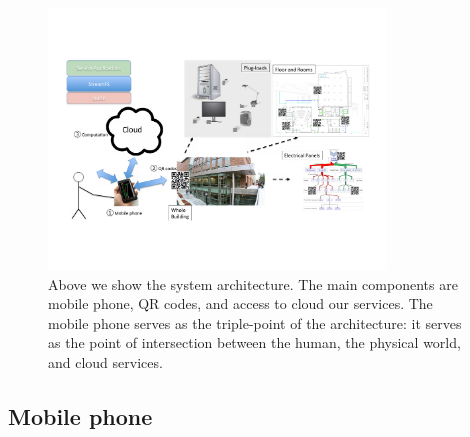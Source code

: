 \begin{figure}[htb!]
\begin{center}
\includegraphics[width=0.8\textwidth]{figs/sysarch}
\caption{Above we show the system architecture.  The main components are mobile phone, QR codes, and access to cloud
our services.  The mobile phone serves as the triple-point of the architecture: it serves as the point of
intersection between the human, the physical world, and cloud services. }
\label{fig:sysarch}
\end{center}
\end{figure}

\subsection{Mobile phone}
\label{sec:mobilephone}

